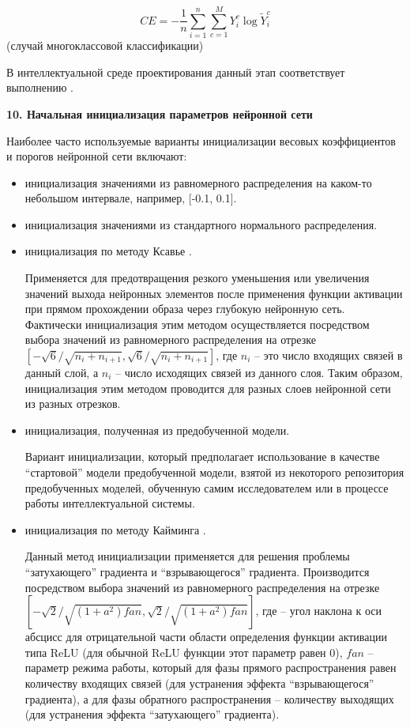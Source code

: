 \begin{equation*}
	CE = - \frac{1}{n} \sum_{i=1}^n \sum_{c=1}^M Y_i^c \log{\widetilde{Y}_i^c}
\end{equation*}
(случай многоклассовой классификации)

В интеллектуальной среде проектирования данный этап соответствует выполнению .


\textbf{10. Начальная инициализация параметров нейронной сети}

Наиболее часто используемые варианты инициализации весовых коэффициентов и порогов нейронной сети включают:
\begin{itemize}
	\item инициализация значениями из равномерного распределения на каком-то небольшом интервале, например, [-0.1, 0.1].
	\item инициализация значениями из стандартного нормального распределения.
	\item инициализация по методу Ксавье .

	Применяется для предотвращения резкого уменьшения или увеличения значений выхода нейронных элементов после применения функции активации при прямом прохождении образа через глубокую нейронную сеть. Фактически инициализация этим методом осуществляется посредством выбора значений из равномерного распределения на отрезке $[- \sqrt{6} / \sqrt{n_i+n_{i+1}}, \sqrt{6} / \sqrt{n_i+n_{i+1}}]$, где $n_i$ -- это число входящих связей в данный слой, а $n_i$ -- число исходящих связей из данного слоя. Таким образом, инициализация этим методом проводится для разных слоев нейронной сети из разных отрезков.

	\item инициализация, полученная из предобученной модели.

	Вариант инициализации, который предполагает использование в качестве ``стартовой'' модели предобученной модели, взятой из некоторого репозитория предобученных моделей, обученную самим исследователем или в процессе работы интеллектуальной системы.

	\item инициализация по методу Кайминга .

	Данный метод инициализации применяется для решения проблемы ``затухающего'' градиента и ``взрывающегося''
	градиента. Производится посредством выбора значений из равномерного распределения на отрезке $[-\sqrt{2} / \sqrt{(1+a^2)fan}, \sqrt{2} / \sqrt{(1+a^2)fan}]$,
	где  -- угол наклона к оси абсцисс для отрицательной части области определения функции активации типа ReLU (для обычной ReLU функции этот параметр равен 0), $fan$ -- параметр режима работы, который для фазы прямого распространения равен количеству входящих связей (для устранения эффекта ``взрывающегося'' градиента), а для фазы обратного распространения -- количеству выходящих (для устранения эффекта ``затухающего'' градиента).
\end{itemize}

